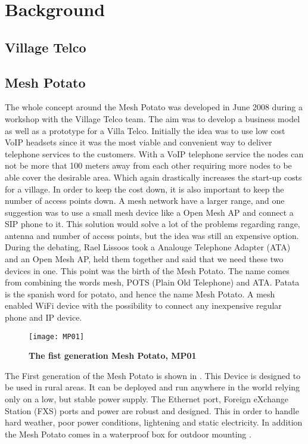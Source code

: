 \chapter{Background}
\label{chp:background} 

\section{Village Telco}

\section{Mesh Potato}



The whole concept around the Mesh Potato was developed in June 2008 during a workshop with the Village Telco team. The aim was to develop a business model as well as a prototype for a Villa Telco. Initially the idea was to use low cost VoIP headsets since it was the most viable and convenient way to deliver telephone services to the customers. With a VoIP telephone service the nodes can not be more that 100 meters away from each other requiring more nodes to be able cover the desirable area. Which again drastically increases the start-up costs for a village. In order to keep the cost down, it is also important to keep the number of access points down. A mesh network have a larger range, and one suggestion was to use a small mesh device like a Open Mesh AP and connect a SIP phone to it. This solution would solve a lot of the problems regarding range, antenna and number of access points, but the idea was still an expensive option. During the debating, Rael Lissoos took a Analouge Telephone Adapter (ATA) and an Open Mesh AP, held them together and said that we need these two devices in one. This point was the birth of the Mesh Potato. The name comes from combining the words mesh, POTS (Plain Old Telephone) and ATA. Patata is the spanish word for potato, and hence the name Mesh Potato. A mesh enabled WiFi device with the possibility to connect any inexpensive regular phone and IP device. \cite{MPorigin}

\begin{figure}[h!]
  \centering
      \texttt{[image: MP01]}
  \caption [The Mesh Potato]{\textbf{The fist generation Mesh Potato, MP01}}
  \label{fig:MP01}
\end{figure}

The First generation of the Mesh Potato is shown in . This Device is designed to be used in rural areas. It can be deployed and run anywhere in the world relying only on a low, but stable power supply. The Ethernet port, Foreign eXchange Station (FXS) ports and power are robust and designed. This in order to handle hard weather, poor power conditions, lightening and static electricity. In addition the Mesh Potato comes in a waterproof box for outdoor mounting \cite{background}.

